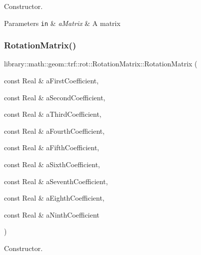 Constructor. 


\begin{DoxyParams}[1]{Parameters}
\mbox{\tt in}  & {\em a\+Matrix} & A matrix \\
\hline
\end{DoxyParams}
\mbox{\label{classlibrary_1_1math_1_1geom_1_1trf_1_1rot_1_1_rotation_matrix_a3b3c098f07de0f6f4e02fc78be368add}} 
\subsubsection{\texorpdfstring{Rotation\+Matrix()}{RotationMatrix()}\hspace{0.1cm}{\footnotesize\ttfamily [2/2]}}
{\footnotesize\ttfamily library\+::math\+::geom\+::trf\+::rot\+::\+Rotation\+Matrix\+::\+Rotation\+Matrix (\begin{DoxyParamCaption}\item[{const Real \&}]{a\+First\+Coefficient,  }\item[{const Real \&}]{a\+Second\+Coefficient,  }\item[{const Real \&}]{a\+Third\+Coefficient,  }\item[{const Real \&}]{a\+Fourth\+Coefficient,  }\item[{const Real \&}]{a\+Fifth\+Coefficient,  }\item[{const Real \&}]{a\+Sixth\+Coefficient,  }\item[{const Real \&}]{a\+Seventh\+Coefficient,  }\item[{const Real \&}]{a\+Eighth\+Coefficient,  }\item[{const Real \&}]{a\+Ninth\+Coefficient }\end{DoxyParamCaption})}



Constructor. 



